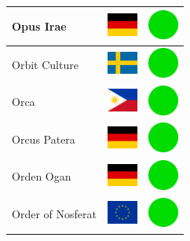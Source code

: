 \documentclass[12pt, a4paper, twoside]{report}
\begin{document}
\begin{center}
\begin{longtable}{|p{5cm}|p{2cm}|p{2cm}|}
 Opus Irae                                                  & \includegraphics[width=1cm]{../4x3/de} &   \includegraphics[width=1cm]{../likes/y} \\ \hline
 Orbit Culture                                              & \includegraphics[width=1cm]{../4x3/se} &   \includegraphics[width=1cm]{../likes/y} \\ \hline
 Orca                                                       & \includegraphics[width=1cm]{../4x3/ph} &   \includegraphics[width=1cm]{../likes/y} \\ \hline
 Orcus Patera                                               & \includegraphics[width=1cm]{../4x3/de} &   \includegraphics[width=1cm]{../likes/y} \\ \hline
 Orden Ogan                                                 & \includegraphics[width=1cm]{../4x3/de} &   \includegraphics[width=1cm]{../likes/y} \\ \hline
 Order of Nosferat                                          & \includegraphics[width=1cm]{../4x3/eu} &   \includegraphics[width=1cm]{../likes/y} \\ \hline

\end{longtable}
\end{center}
\end{document}
